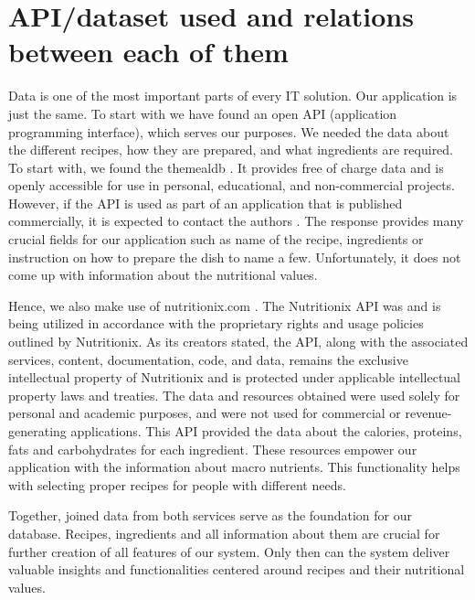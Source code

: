 \section{API/dataset used and relations between each of them}
\par
Data is one of the most important parts of every IT solution. Our application is just the same. To start with we have found an open API (application programming interface), which serves our purposes. We needed the data about the different recipes, how they are prepared, and what ingredients are required. To start with, we found the themealdb \cite{mealdb}. It provides free of charge data and is openly accessible for use in personal, educational, and non-commercial projects. However, if the API is used as part of an application that is published commercially, it is expected to contact the authors \cite{mealdb-faq}. The response provides many crucial fields for our application such as name of the recipe, ingredients or instruction on how to prepare the dish to name a few. Unfortunately, it does not come up with information about the nutritional values.
\par
Hence, we also make use of nutritionix.com \cite{nutritionix}. The Nutritionix API was and is being utilized in accordance with the proprietary rights and usage policies outlined by Nutritionix. As its creators stated, the API, along with the associated services, content, documentation, code, and data, remains the exclusive intellectual property of Nutritionix and is protected under applicable intellectual property laws and treaties. The data and resources obtained were used solely for personal and academic purposes, and were not used for commercial or revenue-generating applications. This API provided the data about the calories, proteins, fats and carbohydrates for each ingredient. These resources empower our application with the information about macro nutrients. This functionality helps with selecting proper recipes for people with different needs.
\par
Together, joined data from both services serve as the foundation for our database.
Recipes, ingredients and all information about them are crucial for further creation of all features of our system. Only then can the system deliver valuable insights and functionalities centered around recipes and their nutritional values.
